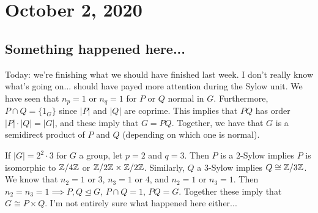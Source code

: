 \section{October 2, 2020}
\subsection{Something happened here...}
Today: we're finishing what we should have finished last week. I don't really know what's going on... should have payed more attention during the Sylow unit. We have seen that $n_p=1$ or $n_q=1$ for $P$ or $Q$ normal in $G$. Furthermore, $P\cap Q=\{1_G\} $ since $|P|$ and $|Q|$ are coprime. This implies that $PQ$ has order $|P|\cdot |Q|=|G|$, and these imply that $G=PQ$. Together, we have that $G$ is a semidirect product of $P$ and $Q$ (depending on which one is normal).
\begin{example}
    If $|G|=2^2\cdot 3$ for $G$ a group, let $p=2$ and $q=3$. Then $P$ is a $2$-Sylow implies $P$ is isomorphic to $\mathbb{Z} /4\mathbb{Z}$ or $\mathbb{Z} /2\mathbb{Z}\times \mathbb{Z} /2\mathbb{Z}$. Similarly, $Q$ a $3$-Sylow implies $Q \cong \mathbb{Z} /3\mathbb{Z}$. We know that $n_2=1$ or $3$, $n_3=1$ or $4$, and $n_2=1$ or $n_3=1$. Then $n_2=n_3=1\implies P,Q\trianglelefteq G$, $P\cap Q=1,\,PQ=G$. Together these imply that $G\cong P\times Q$. I'm not entirely sure what happened here either...
\end{example}

